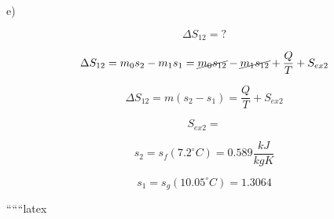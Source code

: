 e)

\[
\Delta S_{12} = ?
\]

\[
\Delta S_{12} = m_0 s_2 - m_1 s_1 = \cancel{m_0 s_{12}} - \cancel{m_1 s_{12}} + \frac{Q}{T} + S_{ex2}
\]

\[
\Delta S_{12} = m (s_2 - s_1) = \frac{Q}{T} + S_{ex2}
\]

\[
S_{ex2} =
\]

\[
s_2 = s_f (7.2^\circ C) = 0.589 \frac{kJ}{kgK}
\]

\[
s_1 = s_g (10.05^\circ C) = 1.3064
\]

``````latex